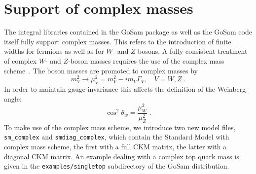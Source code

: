 \documentclass[11pt,a4paper]{refrep}
\newcommand{\gosam}{{\sc GoSam}\xspace}
\begin{document}
\section{Support of complex masses}
\label{sec:complexmasses}
The integral libraries contained in the \gosam{} package as well as the \gosam{} 
code itself fully support complex masses. This refers to the introduction of 
finite widths for fermions as well as
for $W$- and $Z$-bosons. A fully consistent treatment of complex
$W$- and $Z$-boson masses requires the use of the complex mass scheme~\cite{Denner:2005fg}.
The boson masses are promoted to complex masses by
\begin{equation}
 m_{V}^2 \to \mu_{V}^2 = m_{V}^2 -i m_{V} \Gamma_{V},\quad V=W,Z\;.
\end{equation}
In order to maintain gauge invariance this affects the definition of the Weinberg angle:
\begin{equation}
 \cos^2\theta_w = \frac{\mu_W^2}{\mu_Z^2}\;.
\end{equation}
 To make use of the complex mass scheme, we introduce two new model files, \texttt{sm\_complex}
 and \texttt{smdiag\_complex}, which contain the Standard Model with complex mass scheme, the first
 with a full CKM matrix, the latter with a diagonal  CKM matrix.
 An example dealing with a complex top quark mass is given in 
 the {\tt examples/singletop} subdirectory of the \gosam{} distribution.

\end{document}
